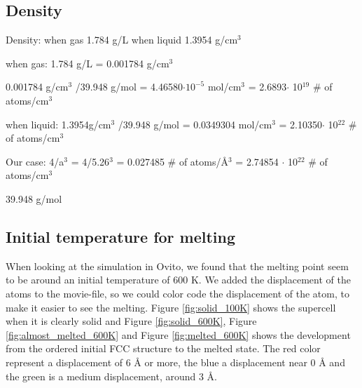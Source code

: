 \subsection{Density}

Density:
when gas 1.784 g/L
when liquid 1.3954 g/cm$^3$

when gas:
1.784 g/L = 0.001784 g/cm$^3$

0.001784 g/cm$^3$ /39.948 g/mol = 4.46580$\cdot 10^{-5}$ mol/cm$^3$ = 2.6893$\cdot$ 10$^{19}$ \# of atoms/cm$^3$

when liquid:
1.3954g/cm$^3$ /39.948 g/mol = 0.0349304 mol/cm$^3$ = 2.10350$\cdot$ 10$^{22}$ \# of atoms/cm$^3$

Our case:
4/a$^3$ = 4/5.26$^3$ = 0.027485 \# of atoms/Å$^3$ = 2.74854 $\cdot$ 10$^{22}$ \# of atoms/cm$^3$


39.948 g/mol

\subsection{Initial temperature for melting}

When looking at the simulation in Ovito, we found that the melting point seem to be around an initial temperature of 600 K. We added the displacement of the atoms to the movie-file, so we could color code the displacement of the atom, to make it easier to see the melting. Figure \ref{fig:solid_100K} shows the supercell when it is clearly solid and Figure \ref{fig:solid_600K}, Figure \ref{fig:almost_melted_600K} and Figure \ref{fig:melted_600K} shows the development from the ordered initial FCC structure to the melted state. The red color represent a displacement of 6 Å or more, the blue a displacement near 0 Å and the green is a medium displacement, around 3 Å. 

